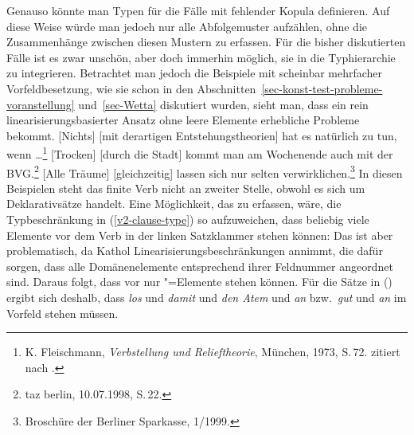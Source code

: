 Genauso könnte man Typen für die Fälle mit fehlender Kopula definieren. Auf diese Weise würde
man jedoch nur alle Abfolgemuster aufzählen, ohne die Zusammenhänge zwischen diesen Mustern
zu erfassen. Für die bisher diskutierten Fälle ist es zwar unschön, aber doch immerhin
möglich, sie in die Typhierarchie zu integrieren. Betrachtet man jedoch die Beispiele mit scheinbar
mehrfacher Vorfeldbesetzung, wie sie schon in den
Abschnitten~\ref{sec-konst-test-probleme-voranstellung} und~\ref{sec-Wetta}
diskutiert wurden, sieht man, dass ein rein linearisierungsbasierter Ansatz ohne leere Elemente
erhebliche Probleme bekommt.
\eal
\ex {}[Nichts] [mit  derartigen     Entstehungstheorien] hat es natürlich zu tun, wenn \ldots\footnote{
        K. Fleischmann, \emph{Verbstellung und Relieftheorie}, München, 1973, S.\,72.
        zitiert nach .}
\label{bsp-nichts-mit-derartigen-udc}
\ex {}[Trocken] [durch   die Stadt] kommt man am     Wochenende auch mit  der BVG.\footnote{
        taz berlin, 10.07.1998, S.\,22.
      }\label{bsp-trocken-durch-die-stadt-udc}
\ex\label{bsp-alle-traeume-udc}
    {}[Alle Träume] [gleichzeitig]  lassen sich nur  selten verwirklichen.\footnote{
        Broschüre der Berliner Sparkasse, 1/1999.
        }
\zl
In diesen Beispielen steht das finite Verb nicht an zweiter Stelle, obwohl es sich um Deklarativsätze
handelt. Eine Möglichkeit, das zu erfassen, wäre, die Typbeschränkung in (\ref{v2-clause-type}) so aufzuweichen,
dass beliebig viele Elemente vor dem Verb in der linken Satzklammer stehen können:
\largerpage
\ea
  \impl {}
\z
Das ist aber problematisch, da Kathol\label{page-Kathol-1-2-3-4} Linearisierungsbeschränkungen annimmt, die dafür sorgen,
dass alle Domänenelemente entsprechend ihrer Feldnummer angeordnet sind. Daraus folgt, dass
vor  nur "=Elemente stehen können. Für die Sätze in () ergibt sich
deshalb, dass \emph{los} und \emph{damit} und \emph{den Atem} und \emph{an} bzw.\ \emph{gut}
und \emph{an} im Vorfeld stehen müssen.
\eal
\label{bsp-particle-vf-udc}
